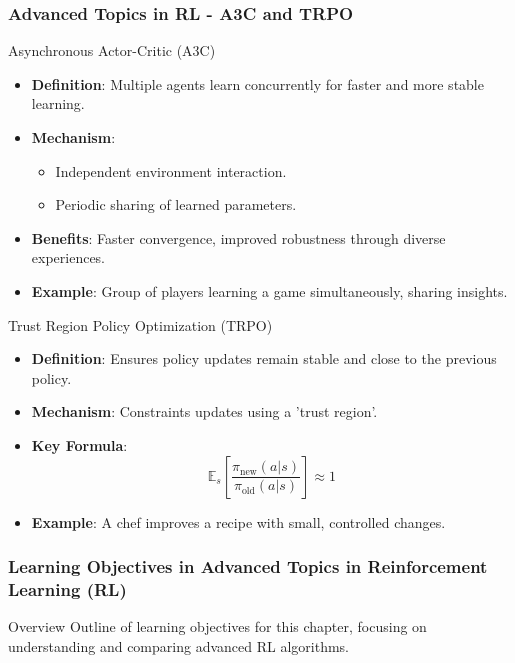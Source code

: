 \documentclass{beamer}
\begin{document}
\begin{frame}[fragile]
    \frametitle{Advanced Topics in RL - A3C and TRPO}
    \begin{block}{Asynchronous Actor-Critic (A3C)}
        \begin{itemize}
            \item \textbf{Definition}: Multiple agents learn concurrently for faster and more stable learning.
            \item \textbf{Mechanism}:
                \begin{itemize}
                    \item Independent environment interaction.
                    \item Periodic sharing of learned parameters.
                \end{itemize}
            \item \textbf{Benefits}: Faster convergence, improved robustness through diverse experiences.
            \item \textbf{Example}: Group of players learning a game simultaneously, sharing insights.
        \end{itemize}
    \end{block}

    \begin{block}{Trust Region Policy Optimization (TRPO)}
        \begin{itemize}
            \item \textbf{Definition}: Ensures policy updates remain stable and close to the previous policy.
            \item \textbf{Mechanism}: Constraints updates using a 'trust region'.
            \item \textbf{Key Formula}:
            \begin{equation}
                \mathbb{E}_{s} \left[ \frac{\pi_{\text{new}}(a|s)}{\pi_{\text{old}}(a|s)} \right] \approx 1
            \end{equation}
            \item \textbf{Example}: A chef improves a recipe with small, controlled changes.
        \end{itemize}
    \end{block}
\end{frame}

\begin{frame}[fragile]
    \frametitle{Learning Objectives in Advanced Topics in Reinforcement Learning (RL)}
    \begin{block}{Overview}
        Outline of learning objectives for this chapter, focusing on understanding and comparing advanced RL algorithms.
    \end{block}
\end{frame}
\end{document}
